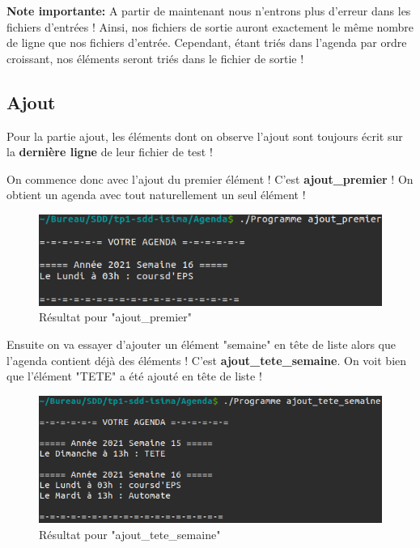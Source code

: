 \documentclass[12pt,french]{article} %
\begin{document}
\textbf{Note importante:} A partir de maintenant nous n'entrons plus d'erreur dans les fichiers d'entrées ! Ainsi, nos fichiers de sortie auront exactement le même nombre de ligne que nos fichiers d'entrée. Cependant, étant triés dans l'agenda par ordre croissant, nos éléments seront triés dans le fichier de sortie !

\subsection{Ajout}

Pour la partie ajout, les éléments dont on observe l'ajout sont toujours écrit sur la \textbf{dernière ligne} de leur fichier de test !\newline

On commence donc avec l'ajout du premier élément ! C'est \textbf{ajout\_premier} ! On obtient un agenda avec tout naturellement un seul élément !\newline

\begin{figure}[H]
	\includegraphics[scale=0.6]{aj-premier.png}
	\centering
	\caption{Résultat pour "ajout\_premier"}
\end{figure}

Ensuite on va essayer d'ajouter un élément "semaine" en tête de liste alors que l'agenda contient déjà des éléments ! C'est \textbf{ajout\_tete\_semaine}. On voit bien que l'élément "TETE" a été ajouté en tête de liste !\newline

\begin{figure}[H]
	\includegraphics[scale=0.6]{aj-tsem.png}
	\centering
	\caption{Résultat pour "ajout\_tete\_semaine"}
\end{figure}
\end{document}
